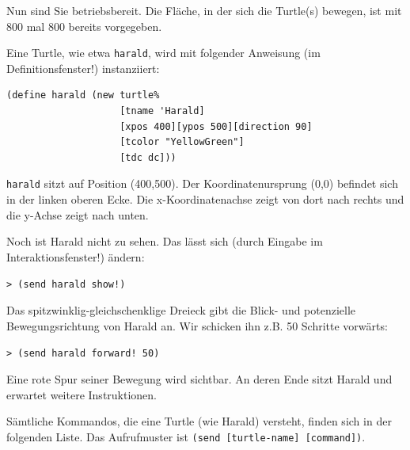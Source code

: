 \documentclass[12pt,a4paper]{scrartcl}
\begin{document}
Nun sind Sie betriebsbereit. Die Fläche, in der sich die Turtle(s) bewegen, ist mit 800 mal 800 bereits vorgegeben. 

Eine Turtle, wie etwa \texttt{harald}, wird mit folgender Anweisung (im Definitionsfenster!) instanziiert:
\begin{verbatim}
(define harald (new turtle% 
                    [tname 'Harald]
                    [xpos 400][ypos 500][direction 90]
                    [tcolor "YellowGreen"]
                    [tdc dc]))
\end{verbatim}

\texttt{harald} sitzt auf Position (400,500). Der Koordinatenursprung (0,0) befindet sich in der linken oberen Ecke. Die x-Koordinatenachse zeigt von dort nach rechts und die y-Achse zeigt nach unten. 

Noch ist Harald nicht zu sehen. Das lässt sich (durch Eingabe im Interaktionsfenster!) ändern:

\verb|> (send harald show!)|

\newpage

Das spitzwinklig-gleichschenklige Dreieck gibt die Blick- und potenzielle Bewegungsrichtung von Harald an. Wir schicken ihn z.B. 50 Schritte vorw\"{a}rts:

\verb|> (send harald forward! 50)|

Eine rote Spur seiner Bewegung wird sichtbar. An deren Ende sitzt Harald und erwartet weitere Instruktionen.

S\"{a}mtliche Kommandos, die eine Turtle (wie Harald) versteht, finden sich in der folgenden Liste. Das Aufrufmuster ist \verb|(send [turtle-name] [command])|.
\end{document}
